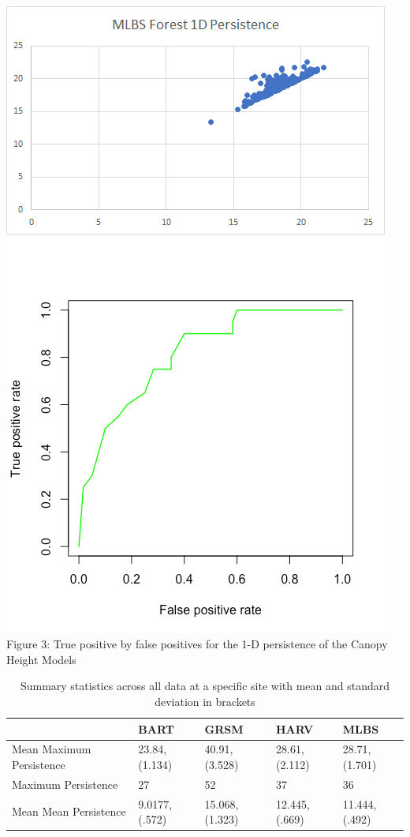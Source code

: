 \documentclass[10pt]{article}
\begin{document}
\includegraphics[scale= 0.5]{mlbs_1d}\\
\includegraphics[scale= 0.5]{1d_roc}\\
Figure 3: True positive by false positives for the 1-D persistence of the Canopy Height Models

\begin{table}[]
\centering
\caption{Summary statistics across all data at a specific site with mean and standard deviation in brackets}
\begin{tabular}{|l|l|l|l|l|}
\hline
                         & BART          & GRSM           & HARV          & MLBS          \\ \hline
Mean Maximum Persistence & 23.84,(1.134) & 40.91,(3.528)  & 28.61,(2.112) & 28.71,(1.701) \\ \hline
Maximum Persistence      & 27            & 52             & 37            & 36            \\ \hline
Mean Mean Persistence    & 9.0177,(.572) & 15.068,(1.323) & 12.445,(.669) & 11.444,(.492) \\ \hline
\end{tabular}
\end{table}
\end{document}
